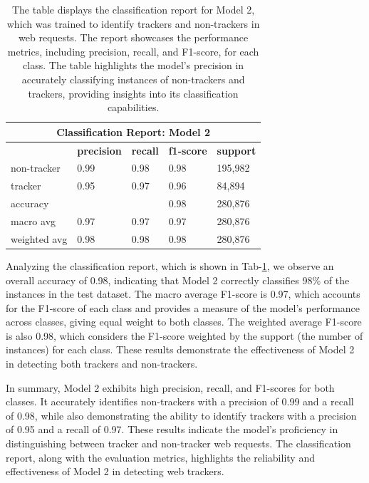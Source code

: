 \begin{table}[ht!]
  \begin{center}
    \begin{tabular}[c]{|l|l|l|l|l|}
      \hline
      \multicolumn{5}{|c|}{\textbf{Classification Report: Model 2}} \\
      \hline
      \textbf{} & \textbf{precision} & \textbf{recall} & \textbf{f1-score} & \textbf{support} \\
      \hline
      non-tracker & 0.99 & 0.98 & 0.98 & 195,982 \\
      \hline
      tracker & 0.95 & 0.97 & 0.96 & 84,894 \\
      \hline
      accuracy & & & 0.98 & 280,876 \\
      \hline
      macro avg & 0.97 & 0.97 & 0.97 & 280,876 \\
      \hline
      weighted avg & 0.98 & 0.98 & 0.98 & 280,876 \\
      
      \hline
    \end{tabular}
  \end{center}

  \caption{The table displays the classification report for Model 2, which was trained to identify trackers and non-trackers
  in web requests. The report showcases the performance metrics, including precision, recall, and F1-score, for each class.
The table highlights the model's precision in accurately classifying instances of non-trackers and trackers, providing insights into
its classification capabilities.}
  \label{tab:m2}
\end{table}
Analyzing the classification report, which is shown in Tab-\ref{tab:m2}, we observe an overall accuracy of 0.98, indicating that Model 2 correctly
classifies 98\% of the instances in the test dataset. The macro average F1-score is 0.97, which accounts for the F1-score
of each class and provides a measure of the model's performance across classes, giving equal weight to both classes. The
weighted average F1-score is also 0.98, which considers the F1-score weighted by the support (the number of instances) for
each class. These results demonstrate the effectiveness of Model 2 in detecting both trackers and non-trackers.

In summary, Model 2 exhibits high precision, recall, and F1-scores for both classes. It accurately identifies non-trackers
with a precision of 0.99 and a recall of 0.98, while also demonstrating the ability to identify trackers with a precision
of 0.95 and a recall of 0.97. These results indicate the model's proficiency in distinguishing between tracker and non-tracker
web requests. The classification report, along with the evaluation metrics, highlights the reliability and effectiveness of Model 2
in detecting web trackers.

